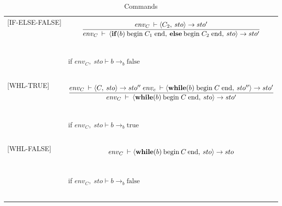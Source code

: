 \begin{longtable}{l l}
[IF-ELSE-FALSE] & \[\frac{env_C \: \vdash \langle C_2, \: sto \rangle \rightarrow sto'}{env_C \: \vdash \: \langle \text{\textbf{if}}(b) \: \text{begin}\;C_{1}\;\text{end}, \: \text{\textbf{else}} \: \text{begin}\; C_2 \; \text{end},\: sto \rangle \rightarrow sto' }\] \\
~ & ~ \\
~ & \indent\indent if $env_C, \; sto \vdash b \rightarrow_b \text{false}$ \\
~ & ~ \\

[WHL-TRUE] & \[\frac{env_C \: \vdash \langle C, \: sto \rangle \rightarrow sto'' \; env_c \: \vdash \langle \text{\textbf{while}}(b)\;\text{begin}\;C\; \text{end}, \: sto'' \rangle \rightarrow sto'}{env_C \: \vdash \: \langle \text{\textbf{while}}(b) \: \text{begin}\;C\;\text{end}, \: sto \rangle \rightarrow sto' }\] \\
~ & ~ \\
~ & \indent\indent if $env_C, \; sto \vdash b \rightarrow_b \text{true}$ \\
~ & ~ \\

[WHL-FALSE] & \[env_C \: \vdash \langle \text{\textbf{while}}(b) \: \text{begin} \: C \: \text{end}, \: sto \rangle \rightarrow sto\] \\
~ & ~ \\
~ & \indent\indent if $env_C, \; sto \vdash b \rightarrow_b \text{false}$ \\
~ & ~ \\

\caption{Commands}
\end{longtable}

